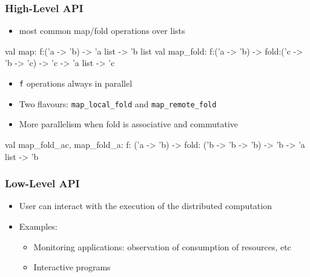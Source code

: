 \documentclass[xcolor=dvipsnames]{beamer}
\begin{document}

\begin{frame}\frametitle {High-Level API}
  \begin{itemize}
  \item most common map/fold operations over lists
  \end{itemize}
  \begin{ocaml}
val map: f:('a -> 'b) -> 'a list -> 'b list
val map_fold: f:('a -> 'b) -> 
              fold:('c -> 'b -> 'c) -> 'c -> 'a list -> 'c
  \end{ocaml}
  \begin{itemize}
  \item \texttt{f} operations always in parallel
  \item Two flavours: \texttt{map\_local\_fold} and
    \texttt{map\_remote\_fold}
  \item More parallelism when fold is associative and commutative
  \end{itemize}
  \begin{ocaml}
val map_fold_ac, map_fold_a:
  f: ('a -> 'b) -> 
  fold: ('b -> 'b -> 'b) -> 'b -> 'a list -> 'b
  \end{ocaml}
\end{frame}


\begin{frame}\frametitle {Low-Level API}
  \begin{itemize}
  \item User can interact with the execution of the distributed
    computation


  \item Examples:
    \begin{itemize}
    \item Monitoring applications: observation of consumption of
      resources, etc
    \item Interactive programs
    \end{itemize}
  \end{itemize}
\end{frame}

\end{document}
